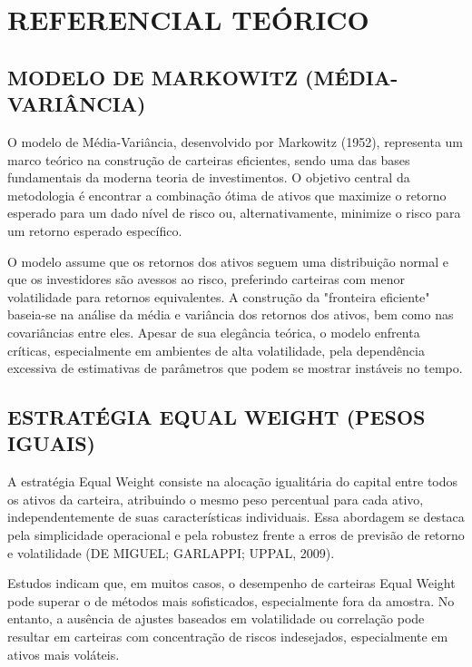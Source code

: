 
\chapter{REFERENCIAL TEÓRICO}

\section{MODELO DE MARKOWITZ (MÉDIA-VARIÂNCIA)}

O modelo de Média-Variância, desenvolvido por Markowitz (1952), representa um marco teórico na construção de carteiras eficientes, sendo uma das bases fundamentais da moderna teoria de investimentos. O objetivo central da metodologia é encontrar a combinação ótima de ativos que maximize o retorno esperado para um dado nível de risco ou, alternativamente, minimize o risco para um retorno esperado específico.

O modelo assume que os retornos dos ativos seguem uma distribuição normal e que os investidores são avessos ao risco, preferindo carteiras com menor volatilidade para retornos equivalentes. A construção da "fronteira eficiente" baseia-se na análise da média e variância dos retornos dos ativos, bem como nas covariâncias entre eles. Apesar de sua elegância teórica, o modelo enfrenta críticas, especialmente em ambientes de alta volatilidade, pela dependência excessiva de estimativas de parâmetros que podem se mostrar instáveis no tempo.

\section{ESTRATÉGIA EQUAL WEIGHT (PESOS IGUAIS)}

A estratégia Equal Weight consiste na alocação igualitária do capital entre todos os ativos da carteira, atribuindo o mesmo peso percentual para cada ativo, independentemente de suas características individuais. Essa abordagem se destaca pela simplicidade operacional e pela robustez frente a erros de previsão de retorno e volatilidade (DE MIGUEL; GARLAPPI; UPPAL, 2009).

Estudos indicam que, em muitos casos, o desempenho de carteiras Equal Weight pode superar o de métodos mais sofisticados, especialmente fora da amostra. No entanto, a ausência de ajustes baseados em volatilidade ou correlação pode resultar em carteiras com concentração de riscos indesejados, especialmente em ativos mais voláteis.

